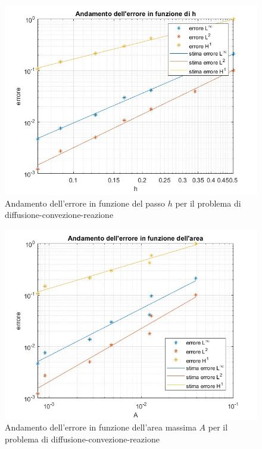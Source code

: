 \documentclass[%
	corpo=11pt,
    twoside,
    stile=classica,
    oldstyle,
    tipotesi=custom,
    greek,
    evenboxes,
]{toptesi}
\begin{document}
\begin{figure}[htbp]
  \centering
    \includegraphics[scale=0.4]{Pictures/errore-neumannfunzinv-h.jpg}
    \caption{Andamento dell'errore in funzione del passo $h$ per il problema di diffusione-convezione-reazione}
    \label{fig:neumann_h}
    \end{figure}
    
    \begin{figure}[htbp]
  \centering
    \includegraphics[scale=0.4]{Pictures/errore-neumann-funzinv-area.jpg}
    \caption{Andamento dell'errore in funzione dell'area massima $A$ per il problema di diffusione-convezione-reazione}
    \label{fig:neumann_area}
    \end{figure}
    
\end{document}
